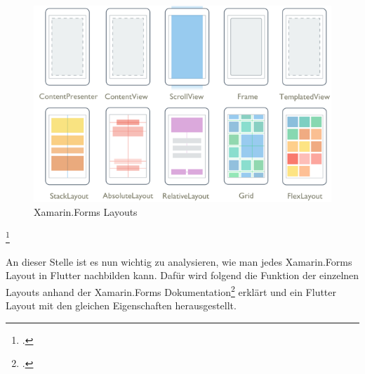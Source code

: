 \begin{figure}[!ht]
 \includegraphics[width=\textwidth,height=\textheight,keepaspectratio]{Images/CrossPlattformFrameworks/XamarinFormsLayouts.png}
 \caption[Xamarin.Forms Layouts]{Xamarin.Forms Layouts\footnotemark}
 \label{fig:Xamarin.Forms Layouts}
\end{figure}
\footcitetext[Abbildung in Anlehnung an ][Abgerufen am \today]{MicrosoftXamLayouts2018}

An dieser Stelle ist es nun wichtig zu analysieren,  wie man jedes Xamarin.Forms Layout in Flutter nachbilden kann.  Dafür wird folgend die Funktion der einzelnen Layouts anhand der Xamarin.Forms Dokumentation\footcite[Vgl.][Abgerufen am \today]{MicrosoftXamLayouts2018} erklärt und ein Flutter Layout mit den gleichen Eigenschaften herausgestellt. 

